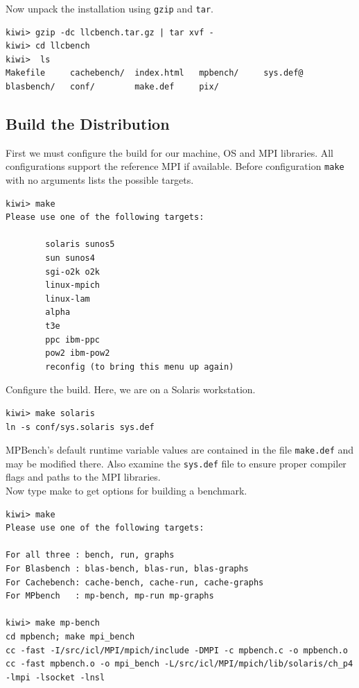\documentclass [12pt]{article}
\begin{document}
Now unpack the installation using {\tt gzip} and {\tt tar}.

\begin{verbatim}
kiwi> gzip -dc llcbench.tar.gz | tar xvf -
kiwi> cd llcbench
kiwi>  ls
Makefile     cachebench/  index.html   mpbench/     sys.def@
blasbench/   conf/        make.def     pix/

\end{verbatim}

\subsection{Build the Distribution}

First we must configure the build for our machine, OS and MPI libraries. All
configurations support the reference MPI if available. Before configuration 
{\tt make} with no arguments lists the possible targets.

\begin{verbatim}
kiwi> make
Please use one of the following targets:

        solaris sunos5
        sun sunos4
        sgi-o2k o2k
        linux-mpich
        linux-lam
        alpha
        t3e
        ppc ibm-ppc
        pow2 ibm-pow2
        reconfig (to bring this menu up again)

\end{verbatim}

Configure the build. Here, we are on a Solaris workstation.

\begin{verbatim}
kiwi> make solaris
ln -s conf/sys.solaris sys.def

\end{verbatim}

MPBench's default runtime variable values are contained in the file {\tt make.def} and may
be modified there.  Also examine the {\tt sys.def} file to ensure proper compiler flags and paths to
the MPI libraries.  \\

Now type make to get options for building a benchmark.

\begin{verbatim}
kiwi> make
Please use one of the following targets:

For all three : bench, run, graphs
For Blasbench : blas-bench, blas-run, blas-graphs
For Cachebench: cache-bench, cache-run, cache-graphs
For MPbench   : mp-bench, mp-run mp-graphs

kiwi> make mp-bench
cd mpbench; make mpi_bench
cc -fast -I/src/icl/MPI/mpich/include -DMPI -c mpbench.c -o mpbench.o
cc -fast mpbench.o -o mpi_bench -L/src/icl/MPI/mpich/lib/solaris/ch_p4 -lmpi -lsocket -lnsl 

\end{verbatim}
\end{document}
